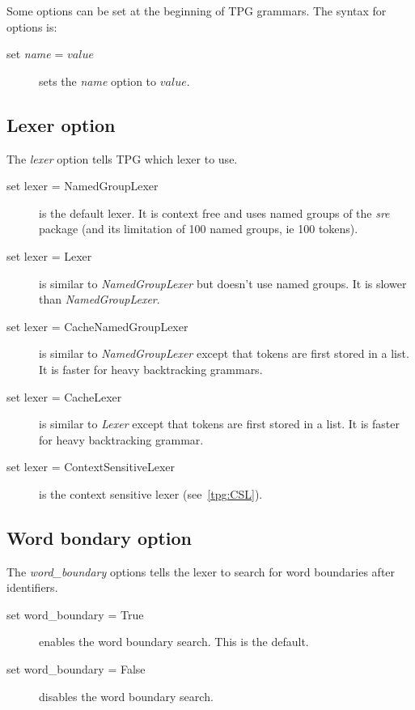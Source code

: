 Some options can be set at the beginning of TPG grammars.
The syntax for options is:

\begin{description}
    \item [set \emph{name} = \emph{$value$}] sets the \emph{name} option to \emph{$value$}.
\end{description}

\subsection{Lexer option}                                   \label{grammar:lexer_option}

The \emph{lexer} option tells TPG which lexer to use.

\begin{description}
    \item [set lexer = NamedGroupLexer] is the default lexer.
        It is context free and uses named groups of the \emph{sre} package (and its limitation of 100 named groups, ie 100 tokens).
    \item [set lexer = Lexer] is similar to \emph{NamedGroupLexer} but doesn't use named groups.
        It is slower than \emph{NamedGroupLexer}.
    \item [set lexer = CacheNamedGroupLexer] is similar to \emph{NamedGroupLexer} except that tokens are first stored in a list.
        It is faster for heavy backtracking grammars.
    \item [set lexer = CacheLexer] is similar to \emph{Lexer} except that tokens are first stored in a list.
        It is faster for heavy backtracking grammar.
    \item [set lexer = ContextSensitiveLexer] is the context sensitive lexer (see~\ref{tpg:CSL}).
\end{description}

\subsection{Word bondary option}                            \label{grammar:word_boundary_option}

The \emph{word\_boundary} options tells the lexer to search for word boundaries after identifiers.

\begin{description}
    \item [set word\_boundary = True] enables the word boundary search. This is the default.
    \item [set word\_boundary = False] disables the word boundary search.
\end{description}

